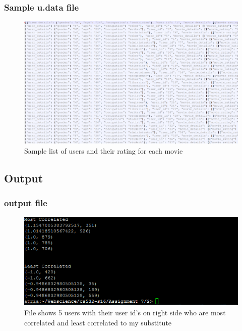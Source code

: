 \subsubsection{Sample u.data file}
\begin{figure}[ht]    
    \begin{center}
        \includegraphics[scale=0.4]{sample_udata.png}
        \caption{Sample list of users and their rating for each movie}
        \label{Samplet1}
    \end{center}
\end{figure}
\newpage

\subsection{Output}

\subsubsection{output file}
\begin{figure}[ht]    
    \begin{center}
        \includegraphics[scale=1.0]{mostandleastcorrelated.png}
        \caption{File shows 5 users with their user id's on right side who are most correlated and least correlated to my substitute}
        \label{Samplet2}
    \end{center}
\end{figure}
\newpage
